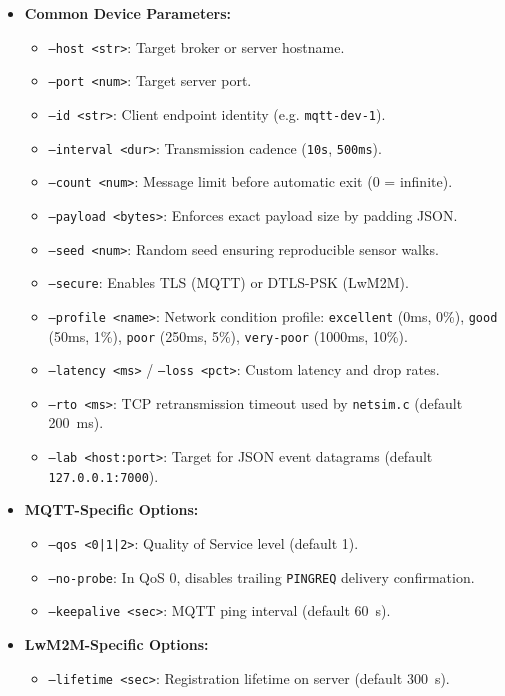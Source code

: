 \documentclass[11pt,a4paper]{article}
\newcommand{\code}[1]{\texttt{#1}}
\begin{document}
\begin{itemize}
  \item \textbf{Common Device Parameters:}
    \begin{itemize}
      \item \code{--host <str>}: Target broker or server hostname.
      \item \code{--port <num>}: Target server port.
      \item \code{--id <str>}: Client endpoint identity (e.g. \code{mqtt-dev-1}).
      \item \code{--interval <dur>}: Transmission cadence (\code{10s}, \code{500ms}).
      \item \code{--count <num>}: Message limit before automatic exit (0 = infinite).
      \item \code{--payload <bytes>}: Enforces exact payload size by padding JSON.
      \item \code{--seed <num>}: Random seed ensuring reproducible sensor walks.
      \item \code{--secure}: Enables TLS (MQTT) or DTLS-PSK (LwM2M).
      \item \code{--profile <name>}: Network condition profile: \code{excellent} (0ms, 0\%), \code{good} (50ms, 1\%), \code{poor} (250ms, 5\%), \code{very-poor} (1000ms, 10\%).
      \item \code{--latency <ms>} / \code{--loss <pct>}: Custom latency and drop rates.
      \item \code{--rto <ms>}: TCP retransmission timeout used by \code{netsim.c} (default 200~ms).
      \item \code{--lab <host:port>}: Target for JSON event datagrams (default \code{127.0.0.1:7000}).
    \end{itemize}
  \item \textbf{MQTT-Specific Options:}
    \begin{itemize}
      \item \code{--qos <0|1|2>}: Quality of Service level (default 1).
      \item \code{--no-probe}: In QoS 0, disables trailing \code{PINGREQ} delivery confirmation.
      \item \code{--keepalive <sec>}: MQTT ping interval (default 60~s).
    \end{itemize}
  \item \textbf{LwM2M-Specific Options:}
    \begin{itemize}
      \item \code{--lifetime <sec>}: Registration lifetime on server (default 300~s).

\end{itemize}
\end{itemize}
\end{document}
